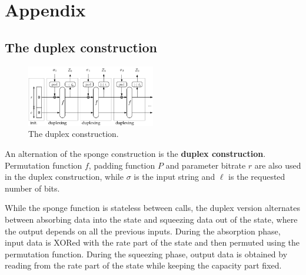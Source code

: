 \section{Appendix}

\subsection{The duplex construction}

\begin{figure}[htbp]
  \centering
  \includegraphics[width=0.5\textwidth]{images/Duplex-150.png}
  \caption{The duplex construction.}
  \label{fig:duplex}
\end{figure}

An alternation of the sponge construction is the \textbf{duplex construction}. Permutation function $f$, padding function $P$ and parameter bitrate $r$ are also used in the duplex construction, while $\sigma$ is the input string and $\ell$ is the requested number of bits. \cite{keccak_team,sponge_function_2023,guido_b_d_michaël_p_2011} \par 

While the sponge function is stateless between calls, the duplex version alternates between absorbing data into the state and squeezing data out of the state, where the output depends on all the previous inputs. \cite{guido_b_d_michaël_p_2011,cryptoeprint:2023/796} During the absorption phase, input data is XORed with the rate part of the state and then permuted using the permutation function. During the squeezing phase, output data is obtained by reading from the rate part of the state while keeping the capacity part fixed. \par